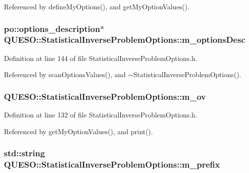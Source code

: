 Referenced by define\-My\-Options(), and get\-My\-Option\-Values().

\hypertarget{class_q_u_e_s_o_1_1_statistical_inverse_problem_options_ac7b8dad567ffef98d5a98061a7d631ea}{
\subsubsection[{m\-\_\-options\-Desc}]{\setlength{\rightskip}{0pt plus 5cm}po\-::options\-\_\-description$\ast$ Q\-U\-E\-S\-O\-::\-Statistical\-Inverse\-Problem\-Options\-::m\-\_\-options\-Desc\hspace{0.3cm}{\ttfamily [private]}}}\label{class_q_u_e_s_o_1_1_statistical_inverse_problem_options_ac7b8dad567ffef98d5a98061a7d631ea}


Definition at line 144 of file Statistical\-Inverse\-Problem\-Options.\-h.



Referenced by scan\-Options\-Values(), and $\sim$\-Statistical\-Inverse\-Problem\-Options().

\hypertarget{class_q_u_e_s_o_1_1_statistical_inverse_problem_options_a3f432ce80a98a70c33376bf9a1c4b36c}{
\subsubsection[{m\-\_\-ov}]{ Q\-U\-E\-S\-O\-::\-Statistical\-Inverse\-Problem\-Options\-::m\-\_\-ov}}\label{class_q_u_e_s_o_1_1_statistical_inverse_problem_options_a3f432ce80a98a70c33376bf9a1c4b36c}


Definition at line 132 of file Statistical\-Inverse\-Problem\-Options.\-h.



Referenced by get\-My\-Option\-Values(), and print().

\hypertarget{class_q_u_e_s_o_1_1_statistical_inverse_problem_options_ad58cf6e7350173ebea80576184a97e2b}{
\subsubsection[{m\-\_\-prefix}]{\setlength{\rightskip}{0pt plus 5cm}std\-::string Q\-U\-E\-S\-O\-::\-Statistical\-Inverse\-Problem\-Options\-::m\-\_\-prefix}}\label{class_q_u_e_s_o_1_1_statistical_inverse_problem_options_ad58cf6e7350173ebea80576184a97e2b}


